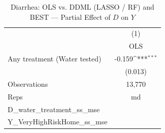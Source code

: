 \begin{table}[htbp]\centering
\def\sym#1{\ifmmode^{#1}\else\(^{#1}\)\fi}
\caption{Diarrhea: OLS vs. DDML (LASSO / RF) and BEST — Partial Effect of $D$ on $Y$}
\begin{tabular}{l*{1}{c}}
\toprule
                &\multicolumn{1}{c}{(1)}\\
                &\multicolumn{1}{c}{OLS}\\
\midrule
Any treatment (Water tested)&   -0.159\sym{***}\\
                &  (0.013)         \\
\midrule
Observations    &   13,770         \\
Reps            &       md         \\
D\_water\_treatment\_ss\_mse&                  \\
Y\_VeryHighRiskHome\_ss\_mse&                  \\
\bottomrule
\end{tabular}
\end{table}
